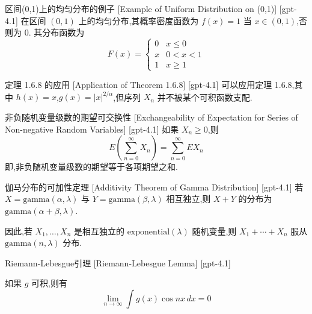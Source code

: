 \documentclass[UTF8]{ctexart}
\begin{document}
    
    
    \begin{xmp}
        {区间(0,1)上的均匀分布的例子}
        [Example of Uniform Distribution on (0,1)]
        [gpt-4.1]
        在区间 $(0,1)$ 上的均匀分布,其概率密度函数为 $f(x) = 1$ 当 $x \in (0, 1)$,否则为 $0$.
其分布函数为
\[
F(x) =
\begin{cases}
0 & x \leq 0 \\
x & 0 < x < 1 \\
1 & x \geq 1
\end{cases}
\]

    \end{xmp}
    
    
    
    \begin{thm}
        {定理 1.6.8 的应用}
        [Application of Theorem 1.6.8]
        [gpt-4.1]
        可以应用定理 1.6.8,其中 $h(x) = x$,$g(x) = |x|^{2/\alpha}$,但序列 $X_n$ 并不被某个可积函数支配.
    \end{thm}
    
    
    
    \begin{thm}
        {非负随机变量级数的期望可交换性}
        [Exchangeability of Expectation for Series of Non-negative Random Variables]
        [gpt-4.1]
        如果 $X_n \geq 0$,则
\[
E\left(\sum_{n=0}^{\infty} X_{n}\right) = \sum_{n=0}^{\infty} E X_{n}
\]
即,非负随机变量级数的期望等于各项期望之和.

    \end{thm}
    
    
    
    \begin{thm}
        {伽马分布的可加性定理}
        [Additivity Theorem of Gamma Distribution]
        [gpt-4.1]
        若 $X = \mathrm{gamma}(\alpha, \lambda)$ 与 $Y = \mathrm{gamma}(\beta, \lambda)$ 相互独立,则 $X + Y$ 的分布为 $\mathrm{gamma}(\alpha + \beta, \lambda)$.

因此,若 $X_1, \dots, X_n$ 是相互独立的 $\mathrm{exponential}(\lambda)$ 随机变量,则 $X_1 + \cdots + X_n$ 服从 $\mathrm{gamma}(n, \lambda)$ 分布.
    \end{thm}
    
    
    
    \begin{lma}
        {Riemann-Lebesgue引理}
        [Riemann-Lebesgue Lemma]
        [gpt-4.1]
        
如果 $g$ 可积,则有
\[
\lim_{n \to \infty} \int g(x) \cos n x\, d x = 0
\]

    \end{lma}
    
\end{document}
